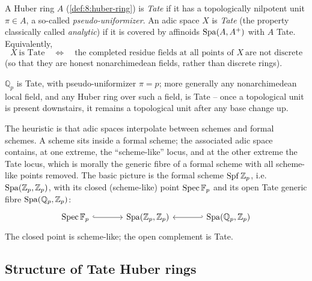 \begin{definition}
\label{def:10:tate}
A Huber ring $A$ (\cref{def:8:huber-ring}) is \emph{Tate} if it has a
topologically nilpotent unit $\pi\in A$, a so-called \emph{pseudo-uniformizer}.
An adic space $X$ is \emph{Tate} (the property classically called
\emph{analytic}) if it is covered by affinoids $\operatorname{Spa}(A,A^{+})$ with $A$ Tate.
Equivalently,
\begin{equation*}
X\ \text{is Tate}\quad\Longleftrightarrow\quad
\text{the completed residue fields at all points of }X\ \text{are not discrete}
\end{equation*}
(so that they are honest nonarchimedean fields, rather than discrete rings).
\end{definition}

\begin{example}
\label{ex:10:tate-examples}
$\mathbb{Q}_p$ is Tate, with pseudo-uniformizer $\pi=p$; more generally any
nonarchimedean local field, and any Huber ring over such a field, is Tate --
once a topological unit is present downstairs, it remains a topological unit
after any base change up.
\end{example}

\begin{remark}
\label{rmk:10:intuition}
The heuristic is that adic spaces interpolate between schemes and formal schemes.
A scheme sits inside a formal scheme; the associated adic space contains, at one
extreme, the ``scheme-like'' locus, and at the other extreme the Tate locus,
which is morally the generic fibre of a formal scheme with all scheme-like
points removed. The basic picture is the formal scheme $\operatorname{Spf}\mathbb{Z}_p$, i.e.
$\operatorname{Spa}(\mathbb{Z}_p,\mathbb{Z}_p)$, with its closed (scheme-like) point
$\operatorname{Spec}\mathbb{F}_p$ and its open Tate generic fibre $\operatorname{Spa}(\mathbb{Q}_p,\mathbb{Z}_p)$:
\[
\begin{tikzcd}[column sep=large]
\Spec \mathbb{F}_p \arrow[r, hook] & \Spa(\mathbb{Z}_p,\mathbb{Z}_p) & \Spa(\mathbb{Q}_p,\mathbb{Z}_p) \arrow[l, hook']
\end{tikzcd}
\]
The closed point is scheme-like; the open complement is Tate.
\end{remark}

\subsection{Structure of Tate Huber rings}

